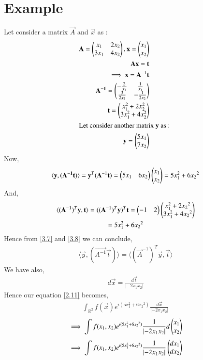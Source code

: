 \documentclass[journal,12pt,twocolumn]{IEEEtran}
\numberwithin{table}{section}
\begin{document}
\section{Example}
Let consider a matrix $\vec{A}$ and $\vec{x}$ as :
\begin{align}
\mathbf{A} = \begin{pmatrix}x_1 & 2x_2 \\ 3x_1  & 4x_2\end{pmatrix}, \mathbf{x} = \begin{pmatrix}x_1 \\x_2\end{pmatrix}\\
\mathbf{A}\mathbf{x} = \mathbf{t}\\
\implies \mathbf{x} = \mathbf{A}^{-1}\mathbf{t}\\
\mathbf{A^{-1}} =\begin{pmatrix}-\frac{2}{x_1} & \frac{1}{x_1} \\ \frac{3}{2x_2} & -\frac{1}{2x_2}\end{pmatrix}\\
\mathbf{t} = \begin{pmatrix}x_1^2 + 2x_2^2 \\ 3x_1^2 + 4x_2^2\end{pmatrix}\\
\intertext{Let consider another matrix $\mathbf{y}$ as : }
\mathbf{y} = \begin{pmatrix}5x_1 \\7x_2\end{pmatrix}
\end{align}
Now,
\begin{multline}
\langle \mathbf{y},(\mathbf{A^{-1}}\mathbf{t}) \rangle =\mathbf{y}^T(\mathbf{A}^{-1}\mathbf{t}) = \begin{pmatrix}5x_1 & 6{x_2}\end{pmatrix}\begin{pmatrix}x_1 \\ x_2\end{pmatrix}  = 5x_1^2 + 6{x_2}^2 \label{3.7}
\end{multline}
And,
\begin{multline}
\langle   (\mathbf{A}^{-1})^T\mathbf{y}, \mathbf{t} \rangle = ((\mathbf{A}^{-1})^T\mathbf{y})^T \mathbf{t} = \begin{pmatrix}-1 & 2\end{pmatrix}\begin{pmatrix}x_1^2 +2{x_2}^2 \\3x_1^2 +4{x_2}^2\end{pmatrix}\\ = 5x_1^2 + 6{x_2}^2 \label{3.8}
\end{multline}
Hence from \eqref{3.7} and \eqref{3.8} we can conclude,
\begin{align}
 \langle \vec{y},(\vec{A^{-1}}\vec{t}) \rangle = \langle (\vec{A}^{-1})^T\vec{y}, \vec{t} \rangle
\end{align}
 We have also, 
 \begin{align}
 d\vec{x} = \frac{d\vec{t}}{  \left | -2x_1x_2 \right|}
 \end{align}
 Hence our equation \eqref{2.11} becomes,
 \begin{align}
 \int_{\mathbb{R}^2} f(\vec{x}) e^{i(5x_1^2 + 6{x_2}^2)}\frac{d\vec{x}}{  \left | -2x_1x_2 \right|}
 \end{align}
\begin{align}
\implies  \int f(x_1,x_2) e^{i(5x_1^2 + 6{x_2}^2)}\frac{1}{  \left | -2x_1x_2 \right|}d\begin{pmatrix}x_1 \\ x_2\end{pmatrix}
\end{align}
\begin{align}
\implies  \int f(x_1,x_2) e^{i(5x_1^2 + 6{x_2}^2)}\frac{1}{  \left | -2x_1x_2 \right|}\begin{pmatrix}dx_1 \\ dx_2\end{pmatrix}
\end{align}
\end{document}
